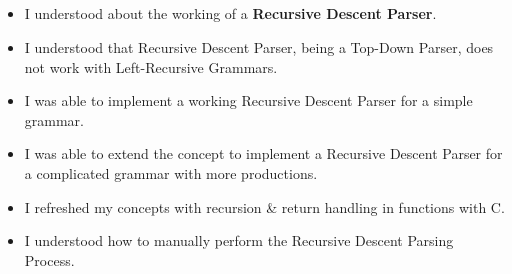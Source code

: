 \documentclass[12pt, a4]{article}
\begin{document}
\newpage
\subsection*{}
\begin{itemize}

\item I understood about the working of a \textbf{Recursive Descent Parser}.
\item I understood that Recursive Descent Parser, being a Top-Down Parser, does not work with Left-Recursive Grammars.
\item I was able to implement a working Recursive Descent Parser for a simple grammar.
\item I was able to extend the concept to implement a Recursive Descent Parser for a complicated grammar with more productions.
\item I refreshed my concepts with recursion \& return handling in functions with C.
\item I understood how to manually perform the Recursive Descent Parsing Process.
\end{itemize}
\end{document}
